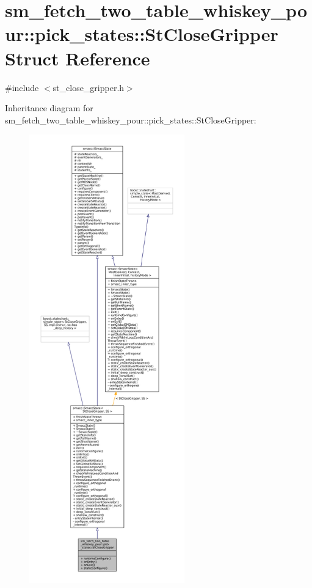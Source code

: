 \hypertarget{structsm__fetch__two__table__whiskey__pour_1_1pick__states_1_1StCloseGripper}{}\section{sm\+\_\+fetch\+\_\+two\+\_\+table\+\_\+whiskey\+\_\+pour\+:\+:pick\+\_\+states\+:\+:St\+Close\+Gripper Struct Reference}
\label{structsm__fetch__two__table__whiskey__pour_1_1pick__states_1_1StCloseGripper}


{\ttfamily \#include $<$st\+\_\+close\+\_\+gripper.\+h$>$}



Inheritance diagram for sm\+\_\+fetch\+\_\+two\+\_\+table\+\_\+whiskey\+\_\+pour\+:\+:pick\+\_\+states\+:\+:St\+Close\+Gripper\+:
\nopagebreak
\begin{figure}[H]
\begin{center}
\leavevmode
\includegraphics[height=550pt]{structsm__fetch__two__table__whiskey__pour_1_1pick__states_1_1StCloseGripper__inherit__graph}
\end{center}
\end{figure}


